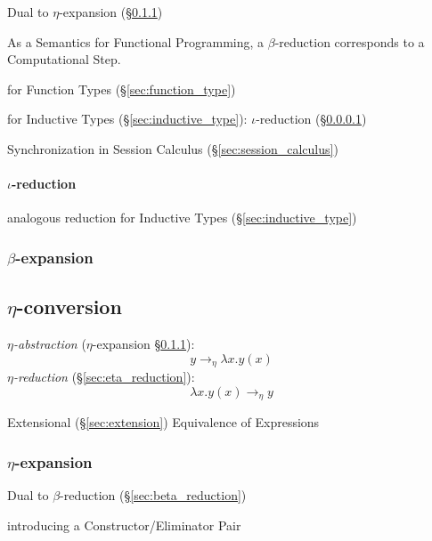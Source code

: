 Dual to $\eta$-expansion (\S\ref{sec:eta_expansion})

As a Semantics for Functional Programming, a $\beta$-reduction
corresponds to a Computational Step.

for Function Types (\S\ref{sec:function_type})

for Inductive Types (\S\ref{sec:inductive_type}): $\iota$-reduction
(\S\ref{sec:iota_reduction})

Synchronization in Session Calculus (\S\ref{sec:session_calculus})
\cite{orchard-yoshida16}



\paragraph{$\iota$-reduction}\label{sec:iota_reduction}\hfill

analogous reduction for Inductive Types (\S\ref{sec:inductive_type})



\subsubsection{$\beta$-expansion}\label{sec:beta_expansion}



\subsection{$\eta$-conversion}\label{sec:eta_conversion}

\emph{$\eta$-abstraction} ($\eta$-expansion \S\ref{sec:eta_expansion}):
\[
  y \rightarrow_\eta \lambda x.y(x)
\]
\emph{$\eta$-reduction} (\S\ref{sec:eta_reduction}):
\[
  \lambda x.y(x) \rightarrow_\eta y
\]

Extensional (\S\ref{sec:extension}) Equivalence of Expressions



\subsubsection{$\eta$-expansion}\label{sec:eta_expansion}

Dual to $\beta$-reduction (\S\ref{sec:beta_reduction})

introducing a Constructor/Eliminator Pair



